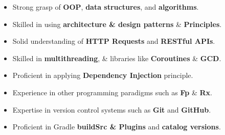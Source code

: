 \documentclass[10pt,a4paper,ragged2e,withhyper]{altacv}
\begin{document}
    \begin{paracol}{2}







        \switchcolumn

        {\large\begin{itemize}

                   \item Strong grasp of \textbf{OOP}, \textbf{data structures}, and \textbf{algorithms}.
                   \item Skilled in using  \textbf{architecture \& design patterns} \& \textbf{Principles}.
                   \item Solid understanding of \textbf{HTTP Requests} and \textbf{RESTful APIs}.
                   \item Skilled in \textbf{multithreading}, \& libraries like \textbf{Coroutines} \& \textbf{GCD}.
                   \item Proficient in applying \textbf{Dependency Injection} principle.
                   \item Experience in other programming paradigms such as \textbf{Fp} \& \textbf{Rx}.
                   \item Expertise in version control systems such as \textbf{Git} and \textbf{GitHub}.
                   \item Proficient in Gradle \textbf{buildSrc \& Plugins} and \textbf{catalog versions}.

        \end{itemize}}



\end{paracol}
\end{document}
